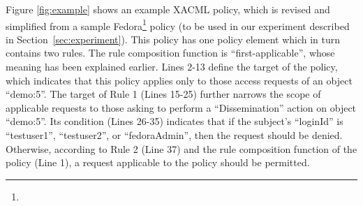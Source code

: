 Figure \ref{fig:example} shows an example XACML policy, which is
revised and simplified from a sample
Fedora\footnote{} policy (to be used
in our experiment described in Section~\ref{sec:experiment}). This
policy has one policy element which in turn contains two rules. The
rule composition function is ``first-applicable'', whose meaning has
been explained earlier. Lines 2-13 define the target of the policy,
which indicates that this policy applies only to those access
requests of an object ``demo:5''. The target of Rule 1 (Lines 15-25)
further narrows the scope of applicable requests to those asking to
perform a ``Dissemination'' action on object ``demo:5''. Its
condition (Lines 26-35) indicates that if the subject's ``loginId''
is ``testuser1'', ``testuser2'', or ``fedoraAdmin'', then the
request should be denied. Otherwise, according to Rule 2 (Line 37)
and the rule composition function of the policy (Line 1), a request
applicable to the policy should be permitted.
